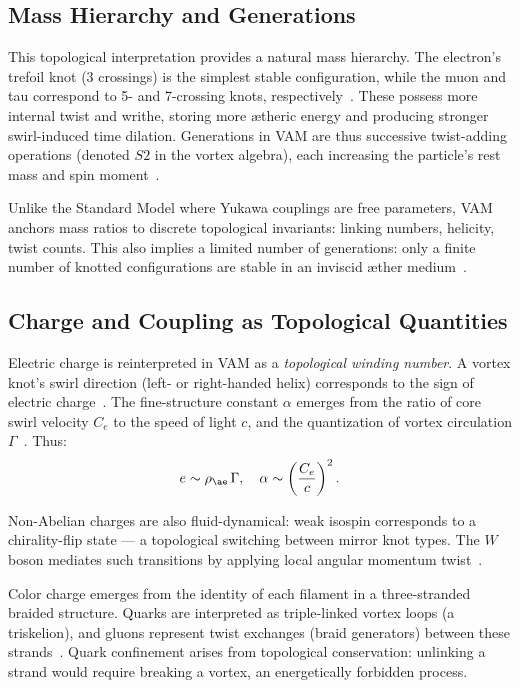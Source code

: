 \subsection*{Mass Hierarchy and Generations}

This topological interpretation provides a natural mass hierarchy. The electron’s trefoil knot (3 crossings) is the simplest stable configuration, while the muon and tau correspond to 5- and 7-crossing knots, respectively~\cite{iskandarani2025vam5}. These possess more internal twist and writhe, storing more ætheric energy and producing stronger swirl-induced time dilation. Generations in VAM are thus successive twist-adding operations (denoted $S2$ in the vortex algebra), each increasing the particle’s rest mass and spin moment~\cite{iskandarani2025vam5}.

Unlike the Standard Model where Yukawa couplings are free parameters, VAM anchors mass ratios to discrete topological invariants: linking numbers, helicity, twist counts. This also implies a limited number of generations: only a finite number of knotted configurations are stable in an inviscid æther medium~\cite{iskandarani2025vam5}.

\subsection*{Charge and Coupling as Topological Quantities}

Electric charge is reinterpreted in VAM as a \emph{topological winding number}. A vortex knot’s swirl direction (left- or right-handed helix) corresponds to the sign of electric charge~\cite{iskandarani2025vam5}. The fine-structure constant $\alpha$ emerges from the ratio of core swirl velocity $C_e$ to the speed of light $c$, and the quantization of vortex circulation $\Gamma$~\cite{iskandarani2025vam5}. Thus:
\[
e \sim \rho_{\ae}\, \Gamma, \quad \alpha \sim \left(\frac{C_e}{c}\right)^2.
\]

Non-Abelian charges are also fluid-dynamical: weak isospin corresponds to a chirality-flip state — a topological switching between mirror knot types. The $W$ boson mediates such transitions by applying local angular momentum twist~\cite{iskandarani2025vam5}.

Color charge emerges from the identity of each filament in a three-stranded braided structure. Quarks are interpreted as triple-linked vortex loops (a triskelion), and gluons represent twist exchanges (braid generators) between these strands~\cite{iskandarani2025vam5}. Quark confinement arises from topological conservation: unlinking a strand would require breaking a vortex, an energetically forbidden process.

